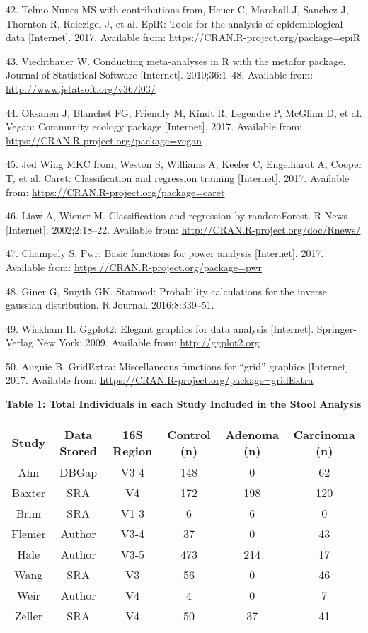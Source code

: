\documentclass[12pt,]{article}
\begin{document}
\hypertarget{ref-epir_citation_2017}{}
42. Telmo Nunes MS with contributions from, Heuer C, Marshall J, Sanchez
J, Thornton R, Reiczigel J, et al. EpiR: Tools for the analysis of
epidemiological data {[}Internet{]}. 2017. Available from:
\url{https://CRAN.R-project.org/package=epiR}

\hypertarget{ref-metafor_citation_2010}{}
43. Viechtbauer W. Conducting meta-analyses in R with the metafor
package. Journal of Statistical Software {[}Internet{]}. 2010;36:1--48.
Available from: \url{http://www.jstatsoft.org/v36/i03/}

\hypertarget{ref-vegan_citation_2017}{}
44. Oksanen J, Blanchet FG, Friendly M, Kindt R, Legendre P, McGlinn D,
et al. Vegan: Community ecology package {[}Internet{]}. 2017. Available
from: \url{https://CRAN.R-project.org/package=vegan}

\hypertarget{ref-caret_citation_2017}{}
45. Jed Wing MKC from, Weston S, Williams A, Keefer C, Engelhardt A,
Cooper T, et al. Caret: Classification and regression training
{[}Internet{]}. 2017. Available from:
\url{https://CRAN.R-project.org/package=caret}

\hypertarget{ref-randomforest_citation_2002}{}
46. Liaw A, Wiener M. Classification and regression by randomForest. R
News {[}Internet{]}. 2002;2:18--22. Available from:
\url{http://CRAN.R-project.org/doc/Rnews/}

\hypertarget{ref-pwr_citation_2017}{}
47. Champely S. Pwr: Basic functions for power analysis {[}Internet{]}.
2017. Available from: \url{https://CRAN.R-project.org/package=pwr}

\hypertarget{ref-statmod_citation_2016}{}
48. Giner G, Smyth GK. Statmod: Probability calculations for the inverse
gaussian distribution. R Journal. 2016;8:339--51.

\hypertarget{ref-ggplot2_citation_2009}{}
49. Wickham H. Ggplot2: Elegant graphics for data analysis
{[}Internet{]}. Springer-Verlag New York; 2009. Available from:
\url{http://ggplot2.org}

\hypertarget{ref-gridextra_citation_2017}{}
50. Auguie B. GridExtra: Miscellaneous functions for ``grid'' graphics
{[}Internet{]}. 2017. Available from:
\url{https://CRAN.R-project.org/package=gridExtra}

\newpage

\textbf{Table 1: Total Individuals in each Study Included in the Stool
Analysis}

\footnotesize

\begin{longtable}[]{@{}cccccc@{}}
\toprule
Study & Data Stored & 16S Region & Control (n) & Adenoma (n) & Carcinoma
(n)\tabularnewline
\midrule
\endhead
Ahn & DBGap & V3-4 & 148 & 0 & 62\tabularnewline
Baxter & SRA & V4 & 172 & 198 & 120\tabularnewline
Brim & SRA & V1-3 & 6 & 6 & 0\tabularnewline
Flemer & Author & V3-4 & 37 & 0 & 43\tabularnewline
Hale & Author & V3-5 & 473 & 214 & 17\tabularnewline
Wang & SRA & V3 & 56 & 0 & 46\tabularnewline
Weir & Author & V4 & 4 & 0 & 7\tabularnewline
Zeller & SRA & V4 & 50 & 37 & 41\tabularnewline
\bottomrule
\end{longtable}
\end{document}
